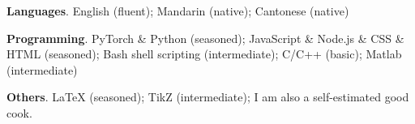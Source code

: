 \documentclass[letterpaper,11pt]{article}
\begin{document}
    \begin{resumeItemize}
        \item \textbf{Languages}. English (fluent); Mandarin (native); Cantonese (native)
        \item \textbf{Programming}. PyTorch \& Python (seasoned); JavaScript \& Node.js \& CSS \& HTML (seasoned); Bash shell scripting (intermediate); C/C++ (basic); Matlab (intermediate)
        \item \textbf{Others}. LaTeX (seasoned); TikZ (intermediate); I am also a self-estimated good cook.
    \end{resumeItemize}
\end{document}
